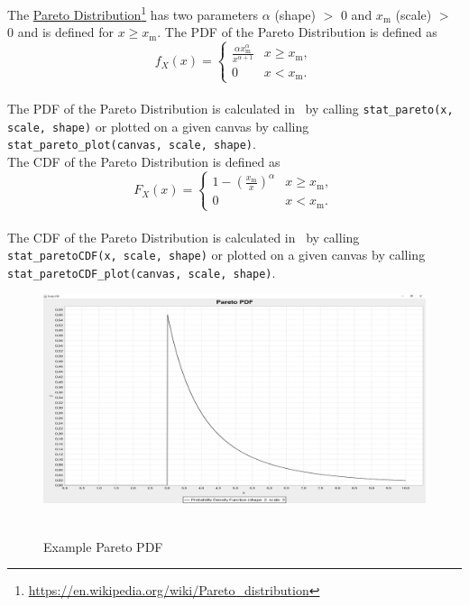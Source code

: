 		The \href{https://en.wikipedia.org/wiki/Pareto_distribution}{Pareto Distribution}\footnote{\url{https://en.wikipedia.org/wiki/Pareto_distribution}} has two parameters $\alpha$ (shape) $>$ 0 and $x_\mathrm{m}$ (scale) $>$ 0 and is defined for $x \geq x_\mathrm{m}$. The \ac{PDF} of the Pareto Distribution is defined as
		\\[0.3cm]
		$$f_X(x)= \begin{cases} \frac{\alpha x_\mathrm{m}^\alpha}{x^{\alpha+1}} & x \ge x_\mathrm{m}, \\ 0 & x < x_\mathrm{m}. \end{cases}$$
		\\[0.3cm]
		The \ac{PDF} of the Pareto Distribution is calculated in \setlx\ by calling \lstinline{stat_pareto(x, scale, shape)} or plotted on a given canvas by calling \lstinline{stat_pareto_plot(canvas, scale, shape)}.
		\\[0.3cm]
		The \ac{CDF} of the Pareto Distribution is defined as
		\\[0.3cm]
		$$F_X(x) = \begin{cases}1-\left(\frac{x_\mathrm{m}}{x}\right)^\alpha & x \ge x_\mathrm{m}, \\0 & x < x_\mathrm{m}.\end{cases}$$
		\\[0.3cm]
		The \ac{CDF} of the Pareto Distribution is calculated in \setlx\ by calling \lstinline{stat_paretoCDF(x, scale, shape)} or plotted on a given canvas by calling \lstinline{stat_paretoCDF_plot(canvas, scale, shape)}.

		\begin{figure}[H]
			\centering
			\includegraphics[width=1\textwidth]{Figures/implemented_functions/pareto_pdf}~\\
			\caption{Example Pareto PDF}
			\label{fig:pareto_pdf}
		\end{figure}


